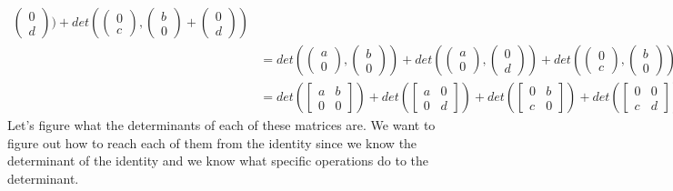 \begin{example}
\begin{align*}
\begin{pmatrix}
        0 \\ d
    \end{pmatrix})+det(\begin{pmatrix}
        0 \\ c
    \end{pmatrix}, \begin{pmatrix}
        b \\ 0
    \end{pmatrix}+\begin{pmatrix}
        0 \\ d
    \end{pmatrix})\\
    &=det(\begin{pmatrix}
        a \\ 0
    \end{pmatrix}, \begin{pmatrix}
        b \\ 0
    \end{pmatrix})+det(\begin{pmatrix}
        a \\ 0
    \end{pmatrix}, \begin{pmatrix}
        0 \\ d
    \end{pmatrix})+det(\begin{pmatrix}
        0 \\ c
    \end{pmatrix}, \begin{pmatrix}
        b \\ 0
    \end{pmatrix})+det(\begin{pmatrix}
        0 \\ c
    \end{pmatrix}, \begin{pmatrix}
        0 \\ d
    \end{pmatrix})\tag{by Multilinearity}\\
    &=det(\begin{bmatrix}
        a & b \\
        0 & 0
    \end{bmatrix})+det(\begin{bmatrix}
        a & 0 \\
        0 & d
    \end{bmatrix})+det(\begin{bmatrix}
        0 & b \\
        c & 0
    \end{bmatrix})+det(\begin{bmatrix}
        0 & 0 \\
        c & d
    \end{bmatrix})
    \end{align*}
    Let's figure what the determinants of each of these matrices are. We want to figure out how to reach each of them from the identity since we know the determinant of the identity and we know what specific operations do to the determinant. 
    

\end{example}
